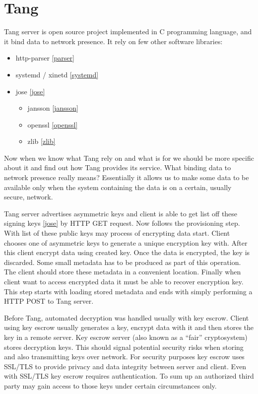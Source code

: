 \documentclass[../xdudla00-porting-Tang-to-Open-WRT.tex]{subfiles}
\begin{document}
\chapter{Tang}\label{tang}


Tang server is open source project implemented in C programming language, and it bind data to network presence.
It rely on few other software libraries:

\begin{itemize}
\item http-parser \ref{parser}
\item systemd / xinetd \ref{systemd}
\item jose \ref{jose}
    \begin{itemize}
    \item jansson \ref{jansson}
    \item openssl \ref{openssl}
    \item zlib \ref{zlib}
    \end{itemize}
\end{itemize}

Now when we know what Tang rely on and what is for we should be more specific about it and find out how Tang provides its service.
What binding data to network presence really means? Essentially it allows us to make some data to be available only when the system containing the data is on a certain, usually secure, network.

Tang server advertises asymmetric keys and client is able to get list off these signing keys \ref{jose} by HTTP GET request.
Now follows the provisioning step. With list of these public keys may process of encrypting data start. Client chooses one of asymmetric keys to generate a unique encryption key with.
After this client encrypt data using created key. Once the data is encrypted, the key is discarded.
Some small metadata has to be produced as part of this operation. The client should store these metadata in a convenient location.
Finally when client want to access encrypted data it must be able to recover encryption key.
This step starts with loading stored metadata and ends with simply performing a HTTP POST to Tang server.

Before Tang, automated decryption was handled usually with key escrow.
Client using key escrow usually generates a key, encrypt data with it and then stores the key in a remote server.
Key escrow server (also known as a “fair” cryptosystem) stores decryption keys. This should signal potential security risks when storing and also transmitting keys over network.
For security purposes key escrow uses SSL/TLS to provide privacy and data integrity between server and client.
Even with SSL/TLS key escrow requires authentication.
To sum up an authorized third party may gain access to those keys under certain circumstances only.
\end{document}
